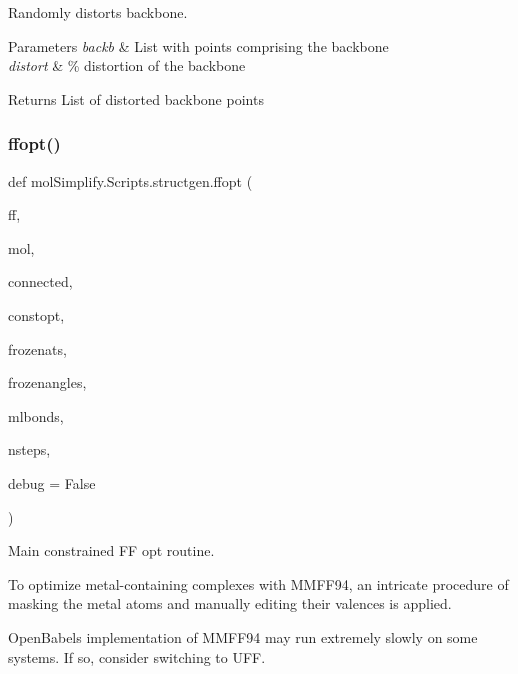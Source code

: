Randomly distorts backbone. 


\begin{DoxyParams}{Parameters}
{\em backb} & List with points comprising the backbone \\
\hline
{\em distort} & \% distortion of the backbone \\
\hline
\end{DoxyParams}
\begin{DoxyReturn}{Returns}
List of distorted backbone points 
\end{DoxyReturn}
\mbox{\label{namespacemolSimplify_1_1Scripts_1_1structgen_a1c48077780530e1f82a2048b3e4e47e2}} 
\subsubsection{\texorpdfstring{ffopt()}{ffopt()}}
{\footnotesize\ttfamily def mol\+Simplify.\+Scripts.\+structgen.\+ffopt (\begin{DoxyParamCaption}\item[{}]{ff,  }\item[{}]{mol,  }\item[{}]{connected,  }\item[{}]{constopt,  }\item[{}]{frozenats,  }\item[{}]{frozenangles,  }\item[{}]{mlbonds,  }\item[{}]{nsteps,  }\item[{}]{debug = {\ttfamily False} }\end{DoxyParamCaption})}



Main constrained FF opt routine. 

To optimize metal-\/containing complexes with M\+M\+F\+F94, an intricate procedure of masking the metal atoms and manually editing their valences is applied.

Open\+Babel\textquotesingle{}s implementation of M\+M\+F\+F94 may run extremely slowly on some systems. If so, consider switching to U\+FF.


